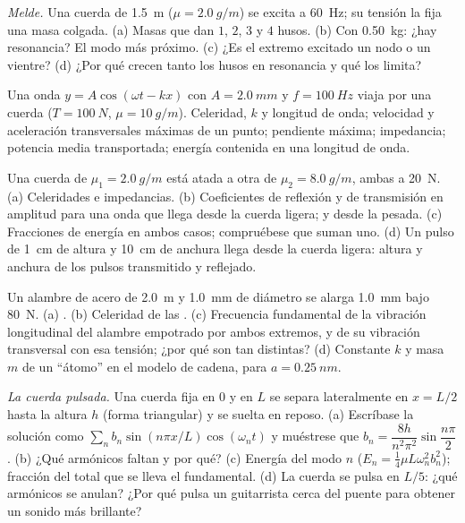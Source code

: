\begin{exercise}[$\star\star$]\label{exo:b2:waves-on-strings:6}
\emph{Melde.} Una cuerda de \qty{1.5}{m} ($\mu = \qty{2.0}{g/m}$) se excita a
\qty{60}{Hz}; su tensión la fija una masa colgada. (a) Masas que dan
$1$, $2$, $3$ y $4$ husos. (b) Con \qty{0.50}{kg}: ¿hay resonancia?
El modo más próximo. (c) ¿Es el extremo excitado un nodo o un vientre?
(d) ¿Por qué crecen tanto los husos en resonancia y qué los limita?
\end{exercise}

\begin{exercise}[$\star\star$]\label{exo:b2:waves-on-strings:7}
Una onda $y = A\cos(\omega t - kx)$ con $A = \qty{2.0}{mm}$ y $f = \qty{100}{Hz}$
viaja por una cuerda ($T = \qty{100}{N}$, $\mu = \qty{10}{g/m}$). Celeridad, $k$
y longitud de onda; velocidad y aceleración transversales máximas de un
punto; pendiente máxima; impedancia; potencia media transportada; energía
contenida en una longitud de onda.
\end{exercise}

\begin{exercise}[$\star\star$]\label{exo:b2:waves-on-strings:8}
Una cuerda de $\mu_1 = \qty{2.0}{g/m}$ está atada a otra de $\mu_2 = \qty{8.0}{g/m}$,
ambas a \qty{20}{N}. (a) Celeridades e impedancias. (b) Coeficientes de
reflexión y de transmisión en amplitud para una onda que llega desde la
cuerda ligera; y desde la pesada. (c) Fracciones de energía en ambos
casos; compruébese que suman uno. (d) Un pulso de \qty{1}{cm} de altura y \qty{10}{cm} de anchura
llega desde la cuerda ligera: altura y anchura de los pulsos transmitido y
reflejado.
\end{exercise}

\begin{exercise}[$\star\star$]\label{exo:b2:waves-on-strings:9}
Un alambre de acero de \qty{2.0}{m} y \qty{1.0}{mm} de diámetro se alarga \qty{1.0}{mm}
bajo \qty{80}{N}. (a) . (b) Celeridad de las .
(c) Frecuencia fundamental de la vibración longitudinal del alambre
empotrado por ambos extremos, y de su vibración transversal con esa
tensión; ¿por qué son tan distintas? (d) Constante $k$ y masa $m$ de un
``átomo'' en el modelo de cadena, para $a = \qty{0.25}{nm}$.
\end{exercise}

\begin{exercise}[$\star\star\star$]\label{exo:b2:waves-on-strings:10}
\emph{La cuerda pulsada.} Una cuerda fija en $0$ y en $L$ se separa
lateralmente en $x = L/2$ hasta la altura $h$ (forma triangular) y se
suelta en reposo. (a) Escríbase la solución como $\sum_nb_n\sin(n\pi x/L)\cos(\omega_nt)$ y muéstrese
que $b_n = \dfrac{8h}{n^2\pi^2}\sin\dfrac{n\pi}2$. (b) ¿Qué armónicos
faltan y por qué? (c) Energía del modo $n$ ($E_n = \tfrac14\mu L\omega_n^2b_n^2$);
fracción del total que se lleva el fundamental. (d) La cuerda se pulsa en
$L/5$: ¿qué armónicos se anulan? ¿Por qué pulsa un guitarrista cerca del
puente para obtener un sonido más brillante?
\end{exercise}

